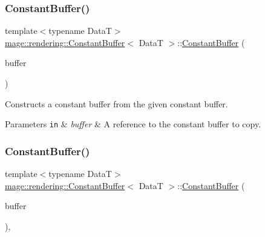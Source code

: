 \subsubsection{\texorpdfstring{Constant\+Buffer()}{ConstantBuffer()}\hspace{0.1cm}{\footnotesize\ttfamily [2/3]}}
{\footnotesize\ttfamily template$<$typename DataT$>$ \\
\mbox{\hyperlink{classmage_1_1rendering_1_1_constant_buffer}{mage\+::rendering\+::\+Constant\+Buffer}}$<$ DataT $>$\+::\mbox{\hyperlink{classmage_1_1rendering_1_1_constant_buffer}{Constant\+Buffer}} (\begin{DoxyParamCaption}\item[{const \mbox{\hyperlink{classmage_1_1rendering_1_1_constant_buffer}{Constant\+Buffer}}$<$ DataT $>$ \&}]{buffer }\end{DoxyParamCaption})\hspace{0.3cm}{\ttfamily [delete]}}

Constructs a constant buffer from the given constant buffer.


\begin{DoxyParams}[1]{Parameters}
\mbox{\tt in}  & {\em buffer} & A reference to the constant buffer to copy. \\
\hline
\end{DoxyParams}
\mbox{\label{classmage_1_1rendering_1_1_constant_buffer_a615874bb60bdde1075ae912d7e5b7a37}} 
\subsubsection{\texorpdfstring{Constant\+Buffer()}{ConstantBuffer()}\hspace{0.1cm}{\footnotesize\ttfamily [3/3]}}
{\footnotesize\ttfamily template$<$typename DataT$>$ \\
\mbox{\hyperlink{classmage_1_1rendering_1_1_constant_buffer}{mage\+::rendering\+::\+Constant\+Buffer}}$<$ DataT $>$\+::\mbox{\hyperlink{classmage_1_1rendering_1_1_constant_buffer}{Constant\+Buffer}} (\begin{DoxyParamCaption}\item[{\mbox{\hyperlink{classmage_1_1rendering_1_1_constant_buffer}{Constant\+Buffer}}$<$ DataT $>$ \&\&}]{buffer }\end{DoxyParamCaption})\hspace{0.3cm}{\ttfamily [default]}, {\ttfamily [noexcept]}}

